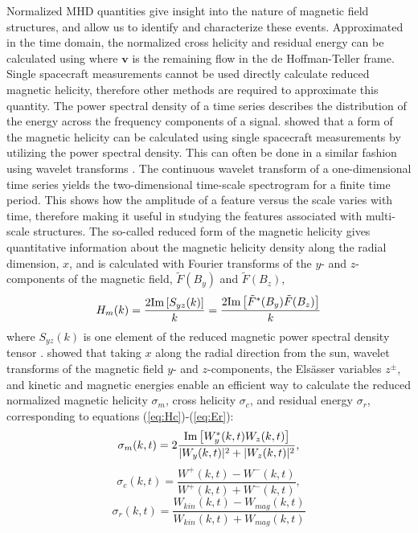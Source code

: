 Normalized MHD quantities give insight into the nature of magnetic field structures, and allow us to identify and characterize these events. Approximated in the time domain, the normalized cross helicity and residual energy can be calculated using
where $\mathbf{v}$ is the remaining flow in the de Hoffman-Teller frame. Single spacecraft measurements cannot be used directly calculate reduced magnetic helicity, therefore other methods are required to approximate this quantity. The power spectral density of a time series describes the distribution of the energy across the frequency components of a signal. \cite{Matthaeus:1982} showed that a form of the magnetic helicity can be calculated using single spacecraft measurements by utilizing the power spectral density. This can often be done in a similar fashion using wavelet transforms \citep{Telloni:2012, Telloni:2013}. The continuous wavelet transform of a one-dimensional time series yields the two-dimensional time-scale spectrogram for a finite time period. This shows how the amplitude of a feature versus the scale varies with time, therefore making it useful in studying the features associated with multi-scale structures. The so-called reduced form of the magnetic helicity gives quantitative information about the magnetic helicity density along the radial dimension, $x$, and is calculated with Fourier transforms of the $y$- and $z$-components of the magnetic field, $\tilde{F}(B_y)$ and $\tilde{F}(B_z)$,
\begin{equation}
    H_m(k) = \frac{2 \textnormal{Im}\left[ S_{yz} (k) \right]}{k} = \frac{2 \textnormal{Im}\left[ \tilde{F}^*(B_y)\tilde{F}(B_z) \right]}{k}
\end{equation}
where $S_{yz}(k)$ is one element of the reduced magnetic power spectral density tensor \citep{Matthaeus:1982}. \cite{Telloni:2012} showed that taking $x$ along the radial direction from the sun, wavelet transforms of the magnetic field $y$- and $z$-components, the Els\"asser variables $z^\pm$, and kinetic and magnetic energies enable an efficient way to calculate the reduced normalized magnetic helicity $\sigma_m$, cross helicity $\sigma_c$, and residual energy $\sigma_r$, corresponding to equations (\ref{eq:Hc})-(\ref{eq:Er}):
\begin{equation}
    \sigma_m(k,t) = 2\frac{\textnormal{Im}\left[ W_y^*(k,t)W_z(k,t) \right]}{|W_y(k,t)|^2 + |W_z(k,t)|^2} ,
    \label{eq:sigm}
\end{equation}
\begin{equation}
        \sigma_c(k,t) = \frac{W^+(k,t)-W^-(k,t)}{W^+(k,t)+W^-(k,t)} ,
        \label{eq:sigc}
\end{equation}
 \begin{equation}
    \sigma_r(k,t) = \frac{W_{kin}(k,t) - W_{mag}(k,t)}{W_{kin}(k,t) + W_{mag}(k,t)}
    \label{eq:sigr}
\end{equation}

